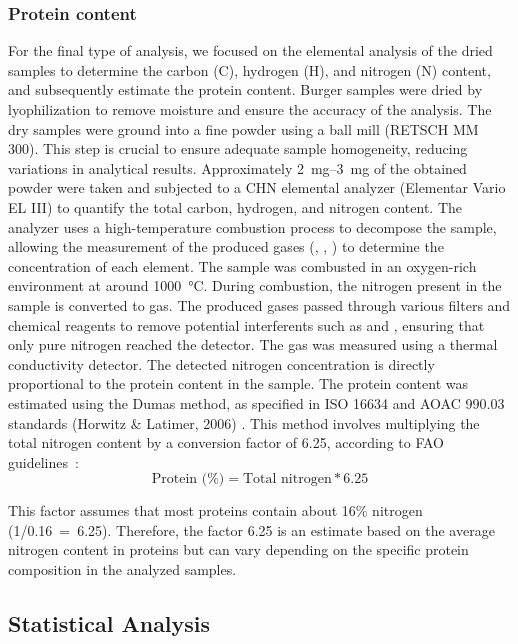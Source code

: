 \subsubsection{Protein content}
For the final type of analysis, we focused on the elemental analysis of the dried samples to determine the carbon (C), hydrogen (H), and nitrogen (N) content, and subsequently estimate the protein content.
Burger samples were dried by lyophilization to remove moisture and ensure the accuracy of the analysis. The dry samples were ground into a fine powder using a ball mill (RETSCH MM 300). This step is crucial to ensure adequate sample homogeneity, reducing variations in analytical results. Approximately \qtyrange{2}{3}{\milli\gram} of the obtained powder were taken and subjected to a CHN elemental analyzer (Elementar Vario EL III) to quantify the total carbon, hydrogen, and nitrogen content. The analyzer uses a high-temperature combustion process to decompose the sample, allowing the measurement of the produced gases (, , ) to determine the concentration of each element.
The sample was combusted in an oxygen-rich environment at around \qty{1000}{\degreeCelsius}. During combustion, the nitrogen present in the sample is converted to  gas. The produced gases passed through various filters and chemical reagents to remove potential interferents such as  and , ensuring that only pure nitrogen reached the detector. The  gas was measured using a thermal conductivity detector. The detected nitrogen concentration is directly proportional to the protein content in the sample.
The protein content was estimated using the Dumas method, as specified in
\zxriv{}ISO 16634 and AOAC 990.03 standards (Horwitz \& Latimer, 2006)\zxriv{}
. This method involves multiplying the total nitrogen content by a conversion factor of 6.25, according to FAO guidelines~\parencite{fao_2003}:
\[
    \text{Protein (\%)} = \text{Total nitrogen} * 6.25
\]

This factor assumes that most proteins contain about \num{16}\% nitrogen \mbox{(1/0.16 = 6.25)}. Therefore, the factor 6.25 is an estimate based on the average nitrogen content in proteins but can vary depending on the specific protein composition in the analyzed samples.

\subsection{Statistical Analysis}
